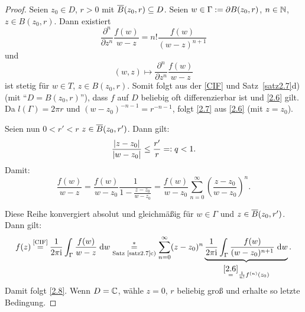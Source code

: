 \documentclass[a4paper,twoside,DIV15,BCOR12mm]{scrbook}
\begin{document}
\begin{proof}
Seien $z_0\in D$, $r > 0$ mit $\overline{B}(z_0,r)\subseteq D$. Seien $w\in\Gamma:= \partial B(z_0,r)$, $n\in\mathbb{N}$, $z\in B(z_0,r)$. Dann existiert
\[\frac{\partial^n}{\partial z^n}\frac{f(w)}{w-z} = n!\frac{f(w)}{(w-z)^{n+1}}\]
und
\[(w,z)\mapsto \frac{\partial^n}{\partial z^n}\frac{f(w)}{w-z}\]
ist stetig für $w\in T$, $z\in B(z_0,r)$. Somit folgt aus der \eqref{CIF} und Satz~\ref{satz2.7}d) (mit ``$D=B(z_0,r)$''), dass $f$ auf $D$ beliebig oft differenzierbar ist und \eqref{2.6} gilt. Da $l(\Gamma) = 2\pi r$ und $(w-z_0)^{-n-1}=r^{-n-1}$, folgt \eqref{2.7} aus \eqref{2.6} (mit $z=z_0$).

Seien nun $0<r'<r$ $z\in\overline{B}(z_0,r')$. Dann gilt:
\[\frac{\left\lvert z-z_0\right\lvert}{\left\lvert w-z_0\right\lvert}\leq\frac{r'}{r}=: q < 1.\]
Damit:
\[\frac{f(w)}{w-z}=\frac{f(w)}{w-z_0}\frac{1}{1-\frac{z-z_0}{w-z_0}} = \frac{f(w)}{w-z_0}\sum_{n=0}^\infty\left(\frac{z-z_0}{w-z_0}\right)^n.\tag{$*$}\]

Diese Reihe konvergiert absolut und gleichmäßig für $w\in\Gamma$ und $z\in\overline{B}(z_0,r')$. Dann gilt:
\[f(z)\!\!\nach{=}{\eqref{CIF}}\!\! \frac{1}{2\pi\i}\integral{\Gamma}{}{\frac{f(w)}{w-z}}{w} \underset{\text{Satz~\ref{satz2.7}c)}}{\overset{*}{=}} \sum_{n=0}^\infty (z-z_0)^n\underbrace{\frac{1}{2\pi\i}\integral{\Gamma}{}{\frac{f(w)}{(w-z_0)^{n+1}}}{w}}_{\overset{\eqref{2.6}}{=}\frac{1}{n!}f^{(n)}(z_0)}.\]
Damit folgt \eqref{2.8}. Wenn $D=\mathbb{C}$, wähle $z =0$, $r$ beliebig groß und erhalte so letzte Bedingung.
\end{proof}
\end{document}
